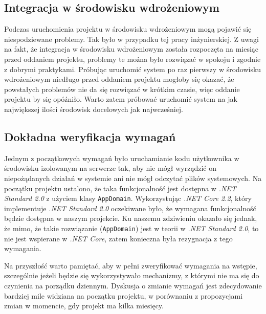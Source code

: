 \documentclass[a4paper,11pt,twoside]{report}
\theoremstyle{definition}
\begin{document}
        \subsection{Integracja w środowisku wdrożeniowym}
            Podczas uruchomienia projektu w środowisku wdrożeniowym mogą pojawić się niespodziewane problemy. Tak było w przypadku tej pracy inżynierskiej. Z uwagi na fakt, że integracja w środowisku wdrożeniowym została rozpoczęta na miesiąc przed oddaniem projektu, problemy te można było rozwiązać w spokoju i zgodnie z dobrymi praktykami.
            Próbując uruchomić system po raz pierwszy w środowisku wdrożeniowym niedługo przed oddaniem projektu mogłoby się okazać, że powstałych problemów nie da się rozwiązać w krótkim czasie, więc oddanie projektu by się opóźniło.
            Warto zatem próbować uruchomić system na jak największej ilości środowisk docelowych jak najwcześniej.
            
        \subsection{Dokładna weryfikacja wymagań}
            Jednym z początkowych wymagań było uruchamianie kodu użytkownika w środowisku izolowanym na serwerze tak, aby nie mógł wyrządzić on niepożądanych działań w systemie ani nie mógł odczytać plików systemowych.
            Na początku projektu ustalono, że taka funkcjonalność jest dostępna w {\textit{.NET Standard 2.0}} z użyciem klasy {\texttt{AppDomain}}. Wykorzystując {\textit{.NET Core 2.2}}, który implementuje {\textit{.NET Standard 2.0}} oczekiwane było, że wymagana funkcjonalność będzie dostępna w naszym projekcie.
            Ku naszemu zdziwieniu okazało się jednak, że mimo, że takie rozwiązanie ({\texttt{AppDomain}}) jest w teorii w {\textit{.NET Standard 2.0}}, to nie jest wspierane w {\textit{.NET Core}}, zatem konieczna była rezygnacja z tego wymagania.
            
            Na przyszłość warto pamiętać, aby w pełni zweryfikować wymagania na wstępie, szczególnie jeżeli będzie się wykorzystywało mechanizmy, z którymi nie ma się do czynienia na porządku dziennym. Dyskusja o zmianie wymagań jest zdecydowanie bardziej mile widziana na początku projektu, w porównaniu z propozycjami zmian w momencie, gdy projekt ma kilka miesięcy.
        
\end{document}
